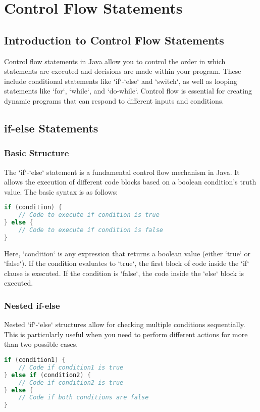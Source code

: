 \documentclass{article}
\begin{document}
\section{Control Flow Statements}
\subsection{Introduction to Control Flow Statements}

Control flow statements in Java allow you to control the order in which statements are executed and decisions are made within your program. These include conditional statements like `if`-`else` and `switch`, as well as looping statements like `for`, `while`, and `do-while`. Control flow is essential for creating dynamic programs that can respond to different inputs and conditions.

\subsection{if-else Statements}
\subsubsection{Basic Structure}
The `if`-`else` statement is a fundamental control flow mechanism in Java. It allows the execution of different code blocks based on a boolean condition's truth value. The basic syntax is as follows:

\begin{lstlisting}[language=Java]
if (condition) {
    // Code to execute if condition is true
} else {
    // Code to execute if condition is false
}
\end{lstlisting}

Here, `condition` is any expression that returns a boolean value (either `true` or `false`). If the condition evaluates to `true`, the first block of code inside the `if` clause is executed. If the condition is `false`, the code inside the `else` block is executed.

\subsubsection{Nested if-else}
Nested `if`-`else` structures allow for checking multiple conditions sequentially. This is particularly useful when you need to perform different actions for more than two possible cases.

\begin{lstlisting}[language=Java]
if (condition1) {
    // Code if condition1 is true
} else if (condition2) {
    // Code if condition2 is true
} else {
    // Code if both conditions are false
}
\end{lstlisting}
\end{document}
